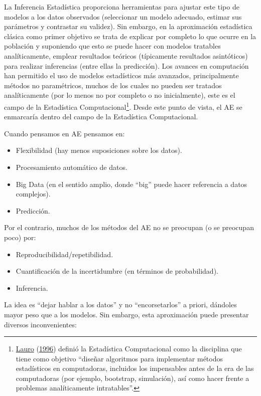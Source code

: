 \documentclass[
  spanish,
]{book}
\theoremstyle{break}
\theoremstyle{definition}
\theoremstyle{definition}
\theoremstyle{definition}
\theoremstyle{definition}
\theoremstyle{remark}
\begin{document}
La Inferencia Estadística proporciona herramientas para ajustar este tipo de modelos a los datos observados (seleccionar un modelo adecuado, estimar sus parámetros y contrastar su validez).
Sin embargo, en la aproximación estadística clásica como primer objetivo se trata de explicar por completo lo que ocurre en la población y suponiendo que esto se puede hacer con modelos tratables analíticamente, emplear resultados teóricos (típicamente resultados asintóticos) para realizar inferencias (entre ellas la predicción).
Los avances en computación han permitido el uso de modelos estadísticos más avanzados, principalmente métodos no paramétricos, muchos de los cuales no pueden ser tratados analíticamente (por lo menos no por completo o no inicialmente), este es el campo de la Estadística Computacional\footnote{\protect\hyperlink{ref-lauro1996computational}{Lauro} (\protect\hyperlink{ref-lauro1996computational}{1996}) definió la Estadística Computacional como la disciplina que tiene como objetivo ``diseñar algoritmos para implementar métodos estadísticos en computadoras, incluidos los impensables antes de la era de las computadoras (por ejemplo, bootstrap, simulación), así como hacer frente a problemas analíticamente intratables''.}. Desde este punto de vista, el AE se enmarcaría dentro del campo de la Estadística Computacional.

Cuando pensamos en AE pensamos en:

\begin{itemize}
\item
  Flexibilidad (hay menos suposiciones sobre los datos).
\item
  Procesamiento automático de datos.
\item
  Big Data (en el sentido amplio, donde ``big'' puede hacer referencia a datos complejos).
\item
  Predicción.
\end{itemize}

Por el contrario, muchos de los métodos del AE no se preocupan (o se preocupan poco) por:

\begin{itemize}
\item
  Reproducibilidad/repetibilidad.
\item
  Cuantificación de la incertidumbre (en términos de probabilidad).
\item
  Inferencia.
\end{itemize}

La idea es ``dejar hablar a los datos'' y no ``encorsetarlos'' a priori, dándoles mayor peso que a los modelos.
Sin embargo, esta aproximación puede presentar diversos inconvenientes:
\end{document}
